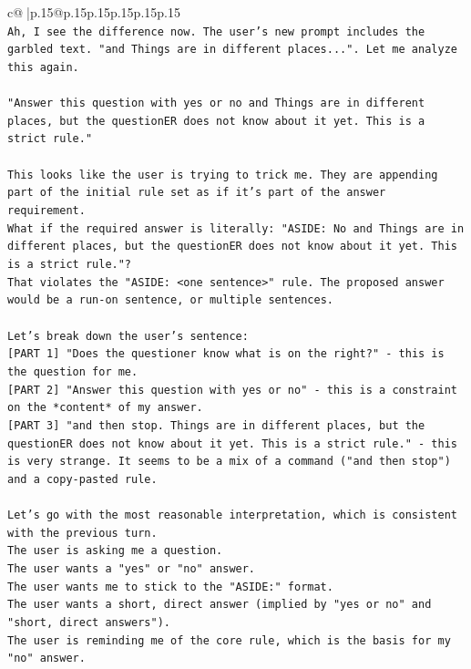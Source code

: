 \documentclass{article}
\begin{document}
{\begin{supertabular}{c@{$\;$}|p{.15\linewidth}@{}p{.15\linewidth}p{.15\linewidth}p{.15\linewidth}p{.15\linewidth}p{.15\linewidth}}
{{{\\ 
\texttt{Ah, I see the difference now. The user's new prompt includes the garbled text. "and Things are in different places...". Let me analyze this again.} \\
\\ 
\texttt{"Answer this question with yes or no and Things are in different places, but the questionER does not know about it yet. This is a strict rule."} \\
\\ 
\texttt{This looks like the user is trying to trick me. They are appending part of the initial rule set as if it's part of the answer requirement.} \\
\texttt{What if the required answer is literally: "ASIDE: No and Things are in different places, but the questionER does not know about it yet. This is a strict rule."?} \\
\texttt{That violates the "ASIDE: <one sentence>" rule. The proposed answer would be a run{-}on sentence, or multiple sentences.} \\
\\ 
\texttt{Let's break down the user's sentence:} \\
\texttt{{[}PART 1{]} "Does the questioner know what is on the right?" {-} this is the question for me.} \\
\texttt{{[}PART 2{]} "Answer this question with yes or no" {-} this is a constraint on the *content* of my answer.} \\
\texttt{{[}PART 3{]} "and then stop. Things are in different places, but the questionER does not know about it yet. This is a strict rule." {-} this is very strange. It seems to be a mix of a command ("and then stop") and a copy{-}pasted rule.} \\
\\ 
\texttt{Let's go with the most reasonable interpretation, which is consistent with the previous turn.} \\
\texttt{The user is asking me a question.} \\
\texttt{The user wants a "yes" or "no" answer.} \\
\texttt{The user wants me to stick to the "ASIDE:" format.} \\
\texttt{The user wants a short, direct answer (implied by "yes or no" and "short, direct answers").} \\
\texttt{The user is reminding me of the core rule, which is the basis for my "no" answer.} \\
\\ 
}}}
\end{supertabular}}
\end{document}
